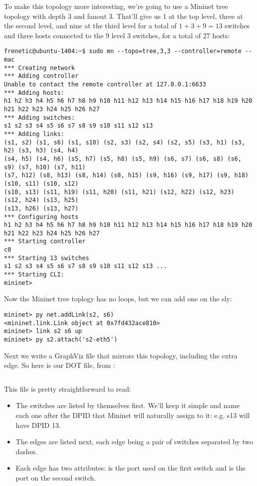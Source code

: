 To make this topology more interesting, we're going to use a Mininet tree topology with depth 3 and fanout 3.
That'll give us 1 at the top level, three at the second level, and nine at the third level
for a total of $1 + 3 + 9 = 13$ switches and three hosts connected to the 9 level 3 switches, for a total of 27
hosts:

\begin{verbatim}
frenetic@ubuntu-1404:~$ sudo mn --topo=tree,3,3 --controller=remote --mac
*** Creating network
*** Adding controller
Unable to contact the remote controller at 127.0.0.1:6633
*** Adding hosts:
h1 h2 h3 h4 h5 h6 h7 h8 h9 h10 h11 h12 h13 h14 h15 h16 h17 h18 h19 h20 h21 h22 h23 h24 h25 h26 h27
*** Adding switches:
s1 s2 s3 s4 s5 s6 s7 s8 s9 s10 s11 s12 s13
*** Adding links:
(s1, s2) (s1, s6) (s1, s10) (s2, s3) (s2, s4) (s2, s5) (s3, h1) (s3, h2) (s3, h3) (s4, h4) 
(s4, h5) (s4, h6) (s5, h7) (s5, h8) (s5, h9) (s6, s7) (s6, s8) (s6, s9) (s7, h10) (s7, h11) 
(s7, h12) (s8, h13) (s8, h14) (s8, h15) (s9, h16) (s9, h17) (s9, h18) (s10, s11) (s10, s12) 
(s10, s13) (s11, h19) (s11, h20) (s11, h21) (s12, h22) (s12, h23) (s12, h24) (s13, h25) 
(s13, h26) (s13, h27)
*** Configuring hosts
h1 h2 h3 h4 h5 h6 h7 h8 h9 h10 h11 h12 h13 h14 h15 h16 h17 h18 h19 h20 h21 h22 h23 h24 h25 h26 h27
*** Starting controller
c0
*** Starting 13 switches
s1 s2 s3 s4 s5 s6 s7 s8 s9 s10 s11 s12 s13 ...
*** Starting CLI:
mininet>
\end{verbatim} 

Now the Mininet tree toplogy has no loops, but we can add one on the sly:

\begin{verbatim}
mininet> py net.addLink(s2, s6) 
<mininet.link.Link object at 0x7fd432ace810>
mininet> link s2 s6 up
mininet> py s2.attach('s2-eth5')
\end{verbatim}

Next we write a GraphViz file that mirrors this topology, including the extra edge.  
So here is our DOT file, from :

\inputminted{python}{code/multiswitch_topologies/multiswitch_topo.dot}

This file is pretty straightforward to read:

\begin{itemize}
\item The switches are listed by themselves first.  We'll keep it simple and name each one after the DPID that
Mininet will naturally assign to it: e.g. s13 will have DPID 13.
\item The edges are listed next, each edge being a pair of switches separated by two dashes.
\item Each edge has two attributes:  is the port used on the first switch and 
is the port on the second switch.  
\end{itemize}

